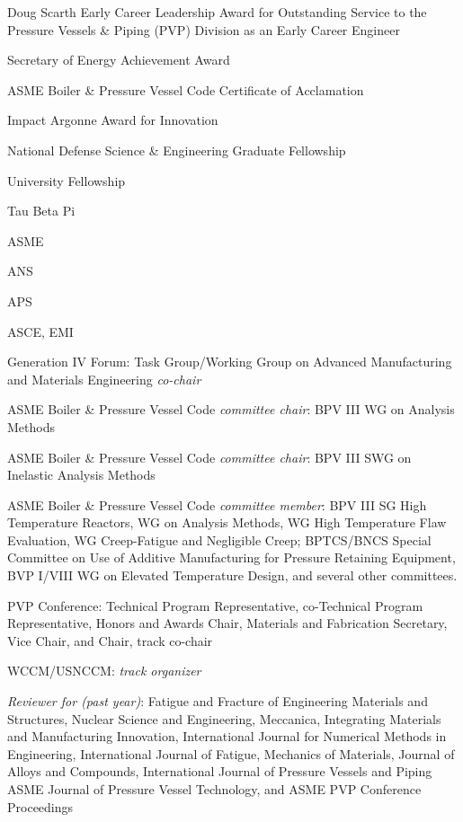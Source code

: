 Doug  Scarth Early Career Leadership Award for Outstanding Service to the Pressure Vessels \& Piping (PVP) Division as an Early Career Engineer

Secretary of Energy Achievement Award 

ASME Boiler \& Pressure Vessel Code Certificate of Acclamation 

Impact Argonne Award for Innovation 

National Defense Science \& Engineering Graduate Fellowship 

University Fellowship 

Tau Beta Pi 


ASME 

ANS 

APS 

ASCE, EMI 


Generation IV Forum:  Task Group/Working Group on Advanced Manufacturing and Materials Engineering \emph{co-chair} 

ASME Boiler \& Pressure Vessel Code \emph{committee chair}:  BPV III WG on Analysis Methods

ASME Boiler \& Pressure Vessel Code \emph{committee chair}:  BPV III SWG on Inelastic Analysis Methods 

ASME Boiler \& Pressure Vessel Code \emph{committee member}:  BPV III SG High Temperature Reactors,
WG on Analysis Methods, WG High Temperature Flaw Evaluation, 
WG Creep-Fatigue and Negligible Creep; BPTCS/BNCS Special Committee on 
Use of Additive Manufacturing for Pressure Retaining Equipment, BVP I/VIII WG on Elevated Temperature Design, and several other committees.

PVP Conference:  Technical Program Representative, co-Technical Program Representative, Honors and Awards Chair, Materials and Fabrication Secretary, Vice Chair, and Chair, track co-chair

WCCM/USNCCM:  \emph{track organizer} 

\emph{Reviewer for (past year)}: 
Fatigue and Fracture of Engineering Materials and Structures,
Nuclear Science and Engineering,
Meccanica,
Integrating Materials and Manufacturing Innovation,
International Journal for Numerical Methods in Engineering,
International Journal of Fatigue,
Mechanics of Materials,
Journal of Alloys and Compounds,
International Journal of Pressure Vessels and Piping
ASME Journal of Pressure Vessel Technology,
and ASME PVP Conference Proceedings

